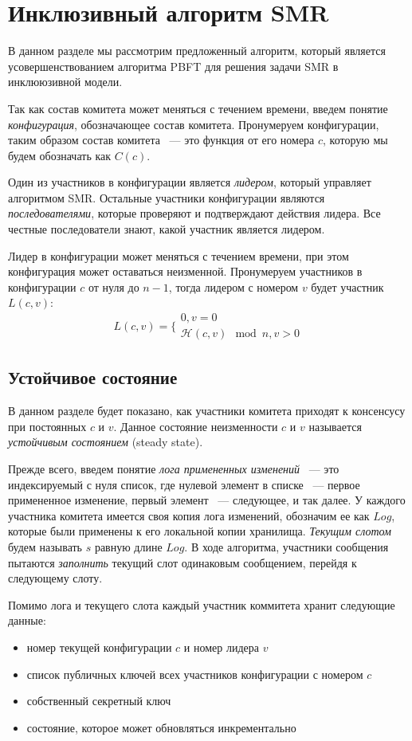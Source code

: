 \section{Инклюзивный алгоритм SMR}
В данном разделе мы рассмотрим предложенный алгоритм, 
который является усовершенствованием алгоритма PBFT\cite{pbft} для решения задачи SMR в инклююзивной модели.
 
Так как состав комитета может меняться с течением времени, введем понятие \textit{конфигурация}, обозначающее состав комитета. Пронумеруем конфигурации, таким образом состав комитета ~--- это функция от его номера $c$, которую мы будем обозначать как $C(c)$. 
 
Один из участников в конфигурации является \textit{лидером}, который управляет алгоритмом SMR. 
Остальные участники конфигурации являются \textit{последователями}, которые проверяют и подтверждают действия лидера. Все честные последователи знают, какой участник является лидером.

Лидер в конфигурации может меняться с течением времени, при этом конфигурация может оставаться неизменной. Пронумеруем участников в конфигурации $c$ от нуля до $n-1$, тогда лидером с номером $v$ будет участник $L(c, v)$:
  \[
  L(c, v)=\Bigg\{ 
  \begin{array}{ll}
  0, v = 0\\
  \mathcal{H}(c, v) \mod n, v > 0 
  \end{array}
  \]

\subsection{Устойчивое состояние} \label{steady-state}
В данном разделе будет показано, как участники комитета приходят к консенсусу при постоянных $c$ и $v$. Данное состояние неизменности $c$ и $v$ называется \textit{устойчивым состоянием} (steady state).

Прежде всего, введем понятие \textit{лога примененных изменений} ~--- это индексируемый с нуля список, где нулевой элемент в списке ~--- первое примененное изменение, первый элемент ~--- следующее, и так далее. У каждого участника комитета имеется своя копия лога изменений, обозначим ее как $Log$, которые были применены к его локальной копии хранилища. \textit{Текущим слотом} будем называть $s$ равную длине $Log$. 
В ходе алгоритма, участники сообщения пытаются \textit{заполнить} текущий слот одинаковым сообщением, перейдя к следующему слоту.

Помимо лога и текущего слота каждый участник коммитета хранит следующие данные:
\begin{itemize}
\item номер текущей конфигурации $c$ и номер лидера $v$
\item список публичных ключей всех участников конфигурации с номером $c$ 
\item собственный секретный ключ
\item состояние, которое может обновляться инкрементально
\end{itemize}

